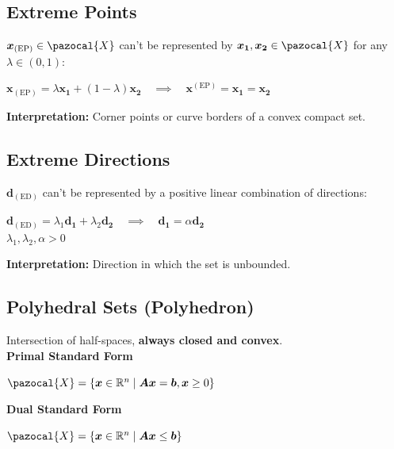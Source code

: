 \documentclass[english]{latex4ei/latex4ei_sheet}
\begin{document}
\begin{sectionbox}
	\subsection{Extreme Points}
	$\bm{x}_{(\text{EP})} \in \pazocal{X}$ can't be represented by $\bm{x_1}, \bm{x_2} \in \pazocal{X}$ for any $\lambda \in (0, 1)$:
	\begin{center}
		$\bm{x}_{(\text{EP})} = \lambda \bm{x_1} + (1-\lambda)\bm{x_2} \quad \implies \quad \bm{x}^{(\text{EP})} = \bm{x_1} = \bm{x_2}$ 
	\end{center}
	\textbf{Interpretation:} Corner points or curve borders of a convex compact set.
	\vspace{0.5em}
	
	\subsection{Extreme Directions}
	$\bm{d}_{(\text{ED})}$ can't be represented by a positive linear combination of directions:
	\begin{center}
		$\bm{d}_{(\text{ED})} = \lambda_1 \bm{d_1} + \lambda_2 \bm{d_2} \quad \implies \quad \bm{d_1} = \alpha\bm{d_2}$ \\
		$\lambda_1, \lambda_2, \alpha > 0$
	\end{center}
	\textbf{Interpretation:} Direction in which the set is unbounded.
	\vspace{0.5em}
	
	\subsection{Polyhedral Sets (Polyhedron)}
	Intersection of half-spaces, \textbf{always closed and convex}. \\
	\vspace{0.3em}
	\textbf{Primal Standard Form}
	\begin{center}
		$\pazocal{X} = \{\bm{x} \in \mathbb{R}^n \mid \bm{A}\bm{x} = \bm{b}, \bm{x} \geq 0 \}$
	\end{center}
	\textbf{ Dual Standard Form}
	\begin{center}
		$\pazocal{X} = \{\bm{x} \in \mathbb{R}^n \mid \bm{A}\bm{x} \leq \bm{b}\}$
	\end{center}
	\vspace{0.5em}


\end{sectionbox}
\end{document}
